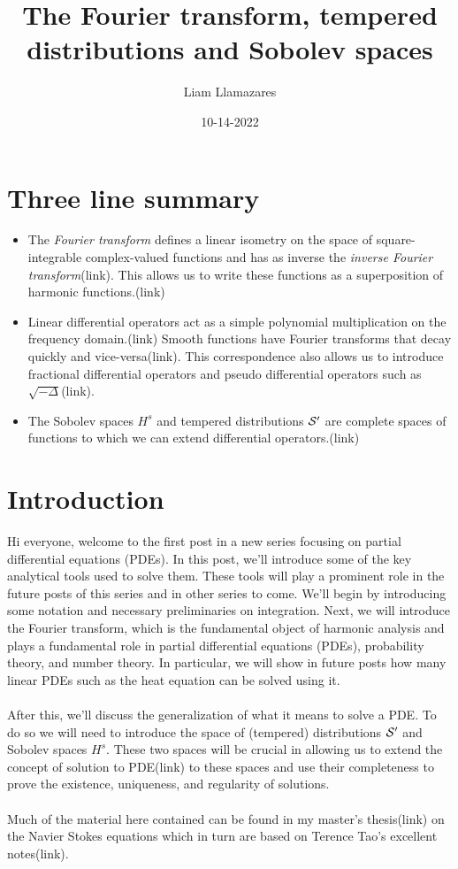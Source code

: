 \documentclass[12pt]{article}
\begin{document}
\begin{CJK*}{UTF8}{gbsn}
	\title{The Fourier transform, tempered distributions and Sobolev spaces}
	\author{Liam Llamazares}
	\date{10-14-2022}
	\maketitle
	\section*{ Three line summary }
	\begin{itemize}
		\item The \emph{Fourier transform} defines a linear isometry on the space of square-integrable complex-valued functions and has as inverse the \emph{inverse Fourier transform}(link). This allows us to write these functions as a superposition of harmonic functions.(link)
		\item Linear differential operators act as a simple polynomial multiplication on the frequency domain.(link) Smooth functions have Fourier transforms that decay quickly and vice-versa(link). This correspondence also allows us to introduce fractional differential operators and pseudo differential operators such as $\sqrt{-\Delta }$(link).
		\item The Sobolev spaces $H^s$ and tempered distributions  ${\mathcal S}'$ are complete spaces of functions to which we can extend differential operators.(link)
	\end{itemize}
	\section*{Introduction}
	Hi everyone, welcome to the first post in a new series focusing on partial differential equations (PDEs). In this post, we'll introduce some of the key analytical tools used to solve them. These tools will play a prominent role in the future posts of this series and in other series to come.  We'll begin by introducing some notation and necessary preliminaries on integration. Next, we will introduce the Fourier transform, which is the fundamental object of harmonic analysis and plays a fundamental role in partial differential equations (PDEs), probability theory, and number theory. In particular, we will show in future posts how many linear PDEs such as the heat equation can be solved using it.\\
	\\
	After this, we'll discuss the generalization of what it means to solve a PDE. To do so we will need to introduce the space of (tempered) distributions ${\mathcal S}'$ and Sobolev spaces $H^s$.	These two spaces will be crucial in allowing us to extend the concept of solution to PDE(link) to these spaces and use their completeness to prove the existence, uniqueness, and regularity of solutions.\\
	\\
	Much of the material here contained can be found in my master's thesis(link) on the Navier Stokes equations which in turn are based on Terence Tao's excellent notes(link).
\end{CJK*}
\end{document}
